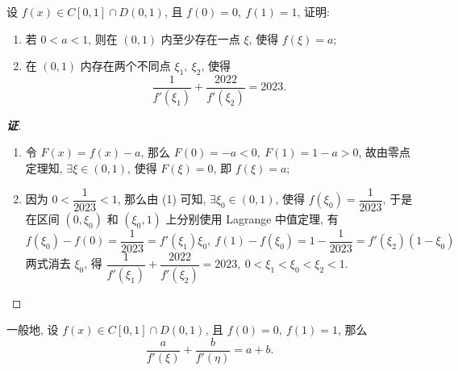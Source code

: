 \begin{example}
    设 $f(x)\in C[0,1]\cap D(0,1)$, 且 $f(0)=0,~f(1)=1$, 证明:
    \begin{enumerate}[label=(\arabic{*})]
        \item 若 $0<a<1$, 则在 $(0,1)$ 内至少存在一点 $\xi$, 使得 $f(\xi)=a$;
        \item 在 $(0,1)$ 内存在两个不同点 $\xi_1,~\xi_2$, 使得 $$\dfrac{1}{f'(\xi_1)}+\dfrac{2022}{f'(\xi_2)}=2023.$$
    \end{enumerate}
\end{example}
\begin{proof}[{\songti \textbf{证}}]
    \begin{enumerate}[label=(\arabic{*})]
        \item 令 $F(x)=f(x)-a$, 那么 $F(0)=-a<0,~F(1)=1-a>0$, 故由零点定理知, $\exists\xi\in(0,1)$, 使得 $F(\xi)=0$, 即 $f(\xi)=a$;
        \item 因为 $0<\dfrac{1}{2023}<1$, 那么由 (1) 可知, $\exists\xi_0\in(0,1)$, 使得 $f(\xi_0)=\dfrac{1}{2023}$, 于是在区间 $(0,\xi_0)$ 和 $(\xi_0,1)$ 上分别使用 Lagrange 中值定理, 有
              $$f(\xi_0)-f(0)=\dfrac{1}{2023}=f'(\xi_1)\xi_0,~f(1)-f(\xi_0)=1-\dfrac{1}{2023}=f'(\xi_2)(1-\xi_0)$$
              两式消去 $\xi_0$, 得 $\dfrac{1}{f'(\xi_1)}+\dfrac{2022}{f'(\xi_2)}=2023,~0<\xi_1<\xi_0<\xi_2<1.$
    \end{enumerate}
\end{proof}
\begin{inference}
    一般地, 设 $f(x)\in C[0,1]\cap D(0,1)$, 且 $f(0)=0,~f(1)=1$, 那么 $$\dfrac{a}{f'(\xi)}+\dfrac{b}{f'(\eta)}=a+b.$$
\end{inference}

